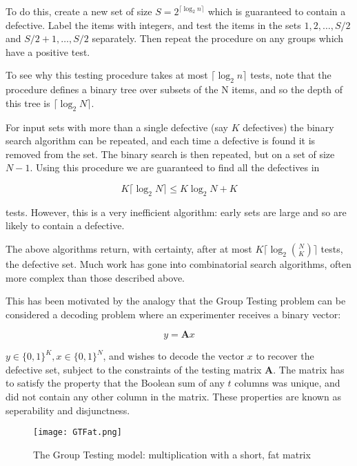 To do this, create a new set of size \(S = 2^{\lceil{\log_2{n}}\rceil}\) which is guaranteed to contain a defective. Label the items with integers, and test the items in the sets \({1,2,\ldots ,S/2}\) and \({S/2 + 1,\ldots ,S/2}\) separately. Then repeat the procedure on any groups which have a positive test. 

To see why this testing procedure takes at most \(\lceil{\log_2{n}}\rceil\) tests, note that the procedure defines a binary tree over subsets of the N items, and so the depth of this tree is \(\lceil{\log_2{N}}\rceil\).

For input sets with more than a single defective (say \(K\) defectives) the binary search algorithm can be repeated, and each time a defective is found it is removed from the set. The binary search is then repeated, but on a set of size \(N-1\). Using this procedure we are guaranteed to find all the defectives in 

\begin{equation}
K \lceil \log_2{N} \rceil \leq K\log_2{N} + K
\end{equation}

tests. However, this is a very inefficient algorithm: early sets are large and so are likely to contain a defective.

The above algorithms return, with certainty, after at most \(K\lceil \log_2{N\choose K}\rceil\) tests, the defective set. Much work has gone into combinatorial search algorithms, often more complex than those described above. 

This has been motivated by the analogy that the Group Testing problem can be considered a decoding problem where an experimenter receives a binary vector: 

\begin{equation}
y = \textbf{A}x
\end{equation}

\(y \in \{0,1\}^K, x \in \{0,1\}^N\), and wishes to decode the vector \(x\) to recover the defective set, subject to the constraints of the testing matrix \(\textbf{A}\). The matrix has to satisfy the property that the Boolean sum of any \(t\) columns was unique, and did not contain any other column in the matrix. These properties are known as seperability and disjunctness. 

\begin{figure*}[h]
\centering
\texttt{[image: GTFat.png]}
\caption{The Group Testing model: multiplication with a short, fat matrix \cite{Atia2008}}
\label{bayesiancs}
\end{figure*}

